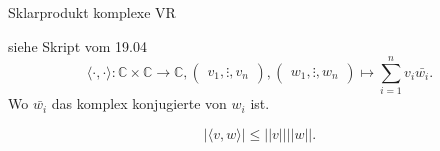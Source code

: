 \documentclass[class=article, crop=false]{standalone}
\begin{document}
\begin{zettel}{Sklarprodukt komplexe VR}
\begin{flashcard}
\begin{definition}
    siehe Skript vom 19.04
    \[
        \langle \cdot,\cdot\rangle : \mathbb{C} \times \mathbb{C} \longrightarrow  \mathbb{C}, \begin{pmatrix}v_1,\vdots,v_n\end{pmatrix}, \begin{pmatrix}w_1,\vdots,w_n\end{pmatrix} \mapsto \sum_{i = 1}^{n} v_i \bar{w_i} 
    .\]
    Wo $ \bar{w_i} $ das komplex konjugierte von $w_i $ ist.
\end{definition}
\end{flashcard}
\begin{lemma}
    \[
        |\langle v,w\rangle| \leq  ||v|| ||w||
    .\]
    
\end{lemma}
\end{zettel}
\end{document}
